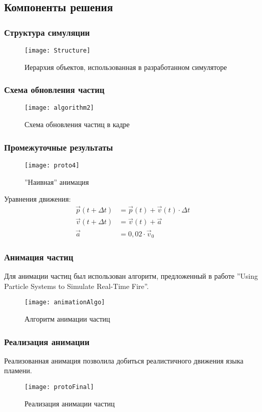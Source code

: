 \subsection{Компоненты решения}
\begin{frame}
\frametitle{Структура симуляции}
\begin{figure}[htb]
	\centering
	\texttt{[image: Structure]}
    \caption{Иерархия объектов, использованная в разработанном симуляторе}%
    \label{fig:simStructure}
\end{figure}
\end{frame}

\begin{frame}
\frametitle{Схема обновления частиц}
\begin{figure}
	\centering
	\texttt{[image: algorithm2]}
    \caption{Схема обновления частиц в кадре}%
    \label{fig:algorithm}
\end{figure}
\end{frame}

\begin{frame}
\frametitle{Промежуточные результаты}
\begin{wrapfigure}{r}{0.4\textwidth}
	\centering
    \texttt{[image: proto4]}
    \caption{''Наивная'' анимация}%
    \label{fig:proto4}
\end{wrapfigure}

Уравнения движения:
\begin{align}
  \label{eq:position}
  \vec{p}(t + \Delta{t}) &= \vec{p}(t) + \vec{v}(t) \cdot \Delta{t} \\
  \label{eq:velocity}
  \vec{v}(t + \Delta{t}) &= \vec{v}(t) + \vec{a} \\
  \label{eq:accelearation}
  \vec{a} &= 0,02 \cdot \vec{v}_{0}
\end{align}
\end{frame}

\begin{frame}
\frametitle{Анимация частиц}
Для анимации частиц был использован алгоритм, предложенный
в работе ''Using Particle Systems to Simulate Real-Time Fire''.
\begin{figure}[htb]
	\centering
    \texttt{[image: animationAlgo]}
    \caption{Алгоритм анимации частиц}%
    \label{fig:animationAlgo}
\end{figure}
\end{frame}

\begin{frame}
\frametitle{Реализация анимации}
Реализованная анимация позволила добиться реалистичного движения языка пламени.
\begin{figure}[htb]
	\centering
    \texttt{[image: protoFinal]}
    \caption{Реализация анимации частиц}%
    \label{fig:protoFinal}
\end{figure}
\end{frame}

